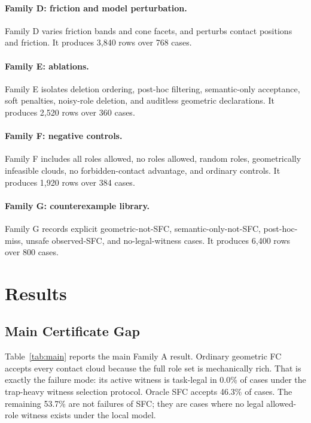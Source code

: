 \documentclass{article}
\begin{document}
\paragraph{Family D: friction and model perturbation.}
Family D varies friction bands and cone facets, and perturbs contact positions and friction. It produces 3,840 rows over 768 cases.

\paragraph{Family E: ablations.}
Family E isolates deletion ordering, post-hoc filtering, semantic-only acceptance, soft penalties, noisy-role deletion, and auditless geometric declarations. It produces 2,520 rows over 360 cases.

\paragraph{Family F: negative controls.}
Family F includes all roles allowed, no roles allowed, random roles, geometrically infeasible clouds, no forbidden-contact advantage, and ordinary controls. It produces 1,920 rows over 384 cases.

\paragraph{Family G: counterexample library.}
Family G records explicit geometric-not-SFC, semantic-only-not-SFC, post-hoc-miss, unsafe observed-SFC, and no-legal-witness cases. It produces 6,400 rows over 800 cases.

\section{Results}

\subsection{Main Certificate Gap}

Table~\ref{tab:main} reports the main Family A result. Ordinary geometric FC accepts every contact cloud because the full role set is mechanically rich. That is exactly the failure mode: its active witness is task-legal in 0.0\% of cases under the trap-heavy witness selection protocol. Oracle SFC accepts 46.3\% of cases. The remaining 53.7\% are not failures of SFC; they are cases where no legal allowed-role witness exists under the local model.
\end{document}
